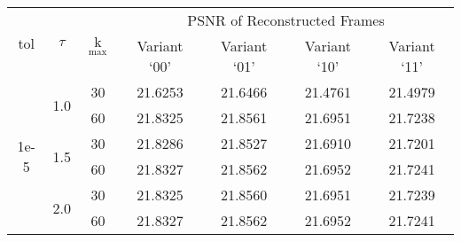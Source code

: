 \documentclass[fleqn, 11pt]{article}
\begin{document}
\begin{table}[H]
    \centering
    \begin{tabular}{||c|c|c||c|c|c|c||}
         \hline
         \multirow{2}{*}{tol} & \multirow{2}{*}{$\tau$} & \multirow{2}{*}{k$_\text{max}$} & \multicolumn{4}{c||}{PSNR of Reconstructed Frames} \\
         \cline{4-7}
         & & & Variant `00' & Variant `01' & Variant `10' & Variant `11' \\
         \hline
         \multirow{6}{*}{1e-5} & \multirow{2}{*}{1.0} & 30 & 21.6253 & 21.6466 & 21.4761 & 21.4979 \\
         \cline{3-7}
          & & 60 & 21.8325 & 21.8561 & 21.6951 & 21.7238 \\
         \cline{3-7}
          & \multirow{2}{*}{1.5} & 30 & 21.8286 & 21.8527 & 21.6910 & 21.7201 \\
         \cline{3-7}
          & & 60 & 21.8327 & 21.8562 & 21.6952 & 21.7241 \\
         \cline{3-7}
          & \multirow{2}{*}{2.0} & 30 & 21.8325 & 21.8560 & 21.6951 & 21.7239 \\
         \cline{3-7}
          & & 60 & 21.8327 & 21.8562 & 21.6952 & 21.7241 \\
         \hline
    \end{tabular}
\end{table}
\end{document}
